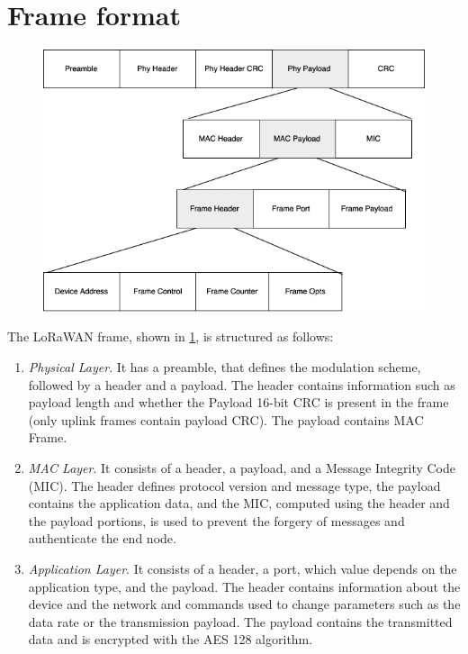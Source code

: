 \section{Frame format}
\begin{figure}[H]
    \centering
    \includegraphics[width=0.7\linewidth]{images/lorawan/frame_format.png}
    \caption{}
    \label{fig:frame}
\end{figure}
The LoRaWAN frame, shown in \ref{fig:frame}, is structured as follows:
\begin{enumerate}
	\item \textit{Physical Layer}.  It has a preamble, that defines the modulation scheme, followed by a header and a payload. The header contains information such as payload length and whether the Payload 16-bit CRC is present in the frame (only uplink frames contain payload CRC). The payload contains MAC Frame.
	\item \textit{MAC Layer}. It consists of a header, a payload, and a Message Integrity Code (MIC). The header defines protocol version and message type, the payload contains the application data, and the MIC, computed using the header and the payload portions, is used to prevent the forgery of messages and authenticate the end node.
	\item \textit{Application Layer}. It consists of a header, a port, which value depends on the application type, and the payload. The header contains information about the device and the network and commands used to change parameters such as the data rate or the transmission payload. The payload contains the transmitted data and is encrypted with the AES 128 algorithm. 
\end{enumerate}


